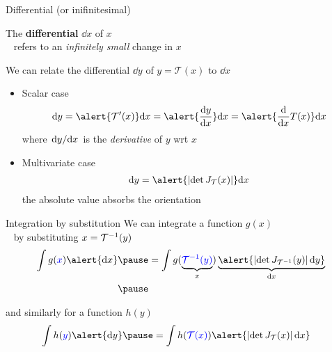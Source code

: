 \documentclass[14pt,dvipsnames]{beamer}
\newcommand{\balert}[1]{\textcolor{blue}{#1}}
\begin{document}
\begin{frame}{Differential (or inifinitesimal)}

	The {\bf differential} $\dd x$ of $x$ \\
	~ refers to an \emph{infinitely small} change in $x$\\ \pause
	\vspace{10pt}

	We can relate the differential $\dd y$ of $y = \mathcal T(x)$ to $\dd x$ \pause
	\begin{itemize}
		\item Scalar case
		\begin{equation*}
			\dd y = \alert{\mathcal T'(x)} \dd x = \alert{\dv{y}{x}} \dd x = \alert{\dv{x}T(x)} \dd x
		\end{equation*}
		where \alert{$\dv*{y}{x}$} is the \emph{derivative} of $y$ wrt $x$ \pause
		\item Multivariate case
		\begin{equation*}
        			\begin{aligned}
			        \dd y = \alert{\djac{\mathcal T}{x}} \dd x %
		        	\end{aligned}
	        	\end{equation*}
		the absolute value absorbs the orientation 
	\end{itemize}

\end{frame}

\begin{frame}{Integration by substitution}	
	We can integrate a function $g(x)$ \\
	~ by substituting $x = { \mathcal T}^{-1}(y)$
	\begin{equation*}
	\begin{aligned}
		\int g(\balert{x}) \alert{\dd x} \pause &= \int g(\underbrace{\balert{\inv{\mathcal T}(y)}}_{x}) \underbrace{\alert{\djac{\inv{\mathcal T}}{y} \dd y}}_{\dd x} \\ \pause
	\end{aligned}
	\end{equation*}
	
	and similarly for a function $h(y)$
	\begin{equation*}
	\begin{aligned}
		\int h(\balert{y}) \alert{\dd y} \pause &= \int h(\balert{\mathcal T(x)}) \alert{\djac{\mathcal T}{x} \dd x}
	\end{aligned}
	\end{equation*} 

\end{frame}
\end{document}
